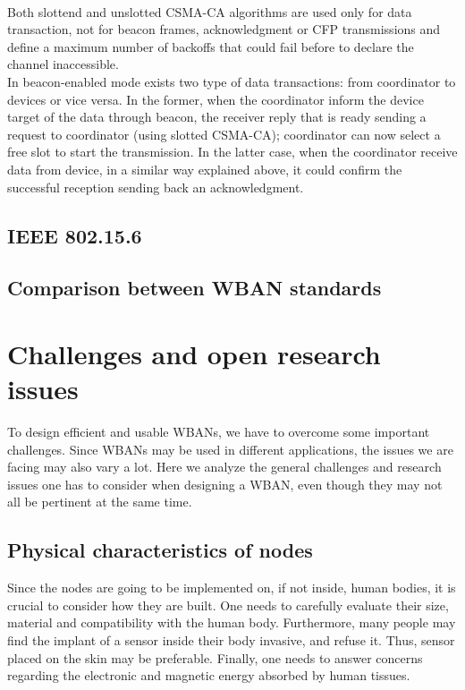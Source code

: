 \documentclass[conference]{IEEEtran}
\begin{document}
\\Both slottend and unslotted CSMA-CA algorithms are used only for data transaction, not for beacon frames, acknowledgment or CFP transmissions and define a maximum number of backoffs that could fail before to declare the channel inaccessible.
\\In beacon-enabled mode exists two type of data transactions: from coordinator to devices or vice versa. In the former, when the coordinator inform the device target of the data through beacon, the receiver reply that is ready sending a request to coordinator (using slotted CSMA-CA); coordinator can now select a free slot to start the transmission. In the latter case, when the coordinator receive data from device, in a similar way explained above, it could confirm the successful reception sending back an acknowledgment. 


\subsection{IEEE 802.15.6}

\subsection{Comparison between WBAN standards}

\section{Challenges and open research issues}
To design efficient and usable WBANs, we have to overcome some important challenges. Since WBANs may be used in different applications, the issues we are facing may also vary a lot. Here we analyze the general challenges and research issues one has to consider when designing a WBAN, even though they may not all be pertinent at the same time.

\subsection {Physical characteristics of nodes}
Since the nodes are going to be implemented on, if not inside, human bodies, it is crucial to consider how they are built. One needs to carefully evaluate their size, material and compatibility with the human body. Furthermore, many people may find the implant of a sensor inside their body invasive, and refuse it. Thus, sensor placed on the skin may be preferable. Finally, one needs to answer concerns regarding the electronic and magnetic energy absorbed by human tissues.
\end{document}

